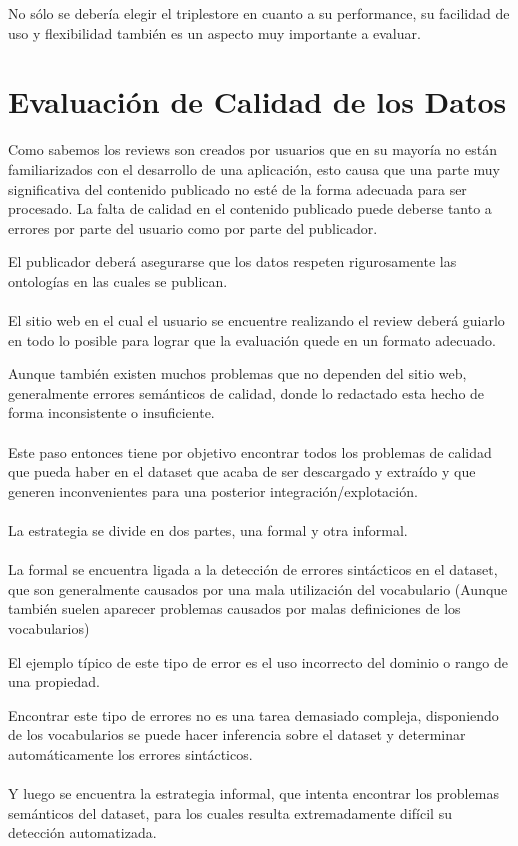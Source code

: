 No sólo se debería elegir el triplestore en cuanto a su performance, su facilidad de uso y flexibilidad también es un aspecto muy importante a evaluar.

%

 

\section{Evaluación de Calidad de los Datos} 
\label{section:evaluacion}
Como sabemos los reviews son creados por usuarios que en su mayoría no están familiarizados con el desarrollo de una 
aplicación, esto causa que una parte muy significativa del contenido publicado no esté de la forma adecuada para ser procesado. 
La falta de calidad en el contenido publicado puede deberse tanto a errores por parte del usuario como por parte del publicador.

El publicador deberá asegurarse que los datos respeten rigurosamente las ontologías en las cuales se publican.
\\\\
El sitio web en el cual el usuario se encuentre realizando el review deberá guiarlo en todo lo posible para lograr que la evaluación
quede en un formato adecuado.

Aunque también existen muchos problemas que no dependen del sitio web, generalmente errores semánticos de calidad, donde lo 
redactado esta hecho de forma inconsistente o insuficiente.
\\\\
Este paso entonces tiene por objetivo encontrar todos los problemas de calidad que pueda haber en el dataset que acaba de 
ser descargado y extraído y que generen inconvenientes para una posterior integración/explotación.
\\\\
La estrategia se divide en dos partes, una formal y otra informal.
\\\\
La formal se encuentra ligada a la detección de errores sintácticos en el dataset, que son generalmente causados por una mala utilización del vocabulario (Aunque también suelen aparecer problemas causados por malas definiciones de los vocabularios)

El ejemplo típico de este tipo de error es el uso incorrecto del dominio o rango de una propiedad. 

Encontrar este tipo de errores no es una tarea demasiado compleja, disponiendo de los vocabularios se puede hacer inferencia sobre el dataset y determinar automáticamente los errores sintácticos.
\\\\
Y luego se encuentra la estrategia informal, que intenta encontrar los problemas semánticos del dataset, para los cuales resulta extremadamente difícil su detección automatizada.

